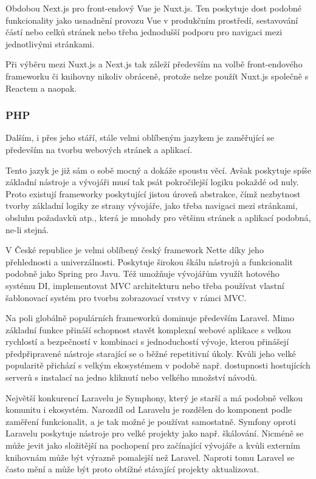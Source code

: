 		Obdobou Next.js pro front-endový Vue je Nuxt.js.
		Ten poskytuje dost podobné funkcionality jako usnadnění provozu Vue v produkčním prostředí, sestavování
		částí nebo celků stránek nebo třeba jednodušší podporu pro navigaci mezi jednotlivými stránkami. \cite{nuxtjs}

		Při výběru mezi Nuxt.js a Next.js tak záleží především na volbě front-endového frameworku či knihovny
		nikoliv obráceně, protože nelze použít Nuxt.js společně s Reactem a naopak.

		\subsubsection{PHP}

		Dalším, i přes jeho stáří, stále velmi oblíbeným jazykem je  zaměřující se především na tvorbu
		webových stránek a aplikací. \cite{php}

		Tento jazyk je již sám o sobě mocný a dokáže spoustu věcí.
		Avšak poskytuje spíše základní nástroje a vývojáři musí tak psát pokročilejší logiku pokaždé od nuly.
		Proto existují frameworky poskytující jistou úroveň abstrakce, čímž nezbytnost tvorby základní logiky ze strany
		vývojáře,
		jako třeba navigaci mezi stránkami, obsluhu požadavků atp., která je mnohdy pro většinu stránek a aplikací podobná,
		ne-li stejná. \cite{best_php_frameworks}

		V České republice je velmi oblíbený český framework Nette díky jeho přehlednosti a univerzálnosti.
		Poskytuje širokou škálu nástrojů a funkcionalit podobně jako Spring pro Javu.
		Též umožňuje vývojářům využít hotového systému \Ac{DI}, implementovat \Ac{MVC} architekturu nebo třeba používat
		vlastní šablonovací systém pro tvorbu zobrazovací vrstvy v rámci \Ac{MVC}. \cite{proc_pouzivat_nette}

		Na poli globálně populárních frameworků dominuje především Laravel.
		Mimo základní funkce přináší schopnost stavět komplexní webové aplikace s velkou rychlostí a bezpečností
		v kombinaci s jednoduchostí vývoje, kterou přinášejí předpřipravené nástroje starající se o běžné repetitivní
		úkoly.
		Kvůli jeho velké popularitě přichází s velkým ekosystémem v podobě např. dostupnosti hostujících serverů
		s instalací na jedno kliknutí nebo velkého množství návodů. \cite{best_php_frameworks}

		Největší konkurencí Laravelu je Symphony, který je starší a má podobně velkou komunitu i ekosystém.
		Narozdíl od Laravelu je rozdělen do komponent podle zaměření funkcionalit, a je tak možné je používat samostatně. \cite{best_php_frameworks}
		Symfony oproti Laravelu poskytuje nástroje pro velké projekty jako např. škálování.
		Nicméně se může jevit jako složitější na pochopení pro začínající vývojáře a kvůli externím knihovnám může být výrazně pomalejší
		než Laravel.
		Naproti tomu Laravel se často mění a může být proto obtížné stávající projekty aktualizovat.
		\cite{laravel_vs_symfony_in_2021}

